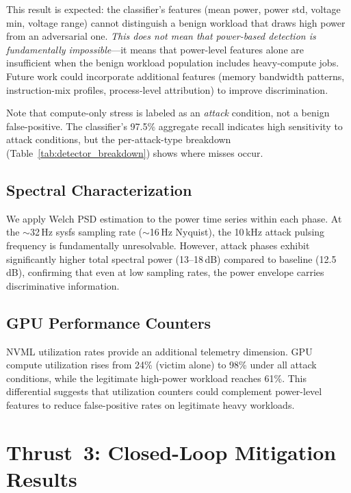 \documentclass[conference]{IEEEtran}
\begin{document}
This result is expected: the classifier's features (mean power, power
std, voltage min, voltage range) cannot distinguish a benign workload
that draws high power from an adversarial one.  \emph{This does not
mean that power-based detection is fundamentally impossible}---it means
that power-level features alone are insufficient when the benign
workload population includes heavy-compute jobs.  Future work could
incorporate additional features (memory bandwidth patterns,
instruction-mix profiles, process-level attribution) to improve
discrimination.

Note that compute-only stress is labeled as an \emph{attack}
condition, not a benign false-positive.  The classifier's 97.5\%
aggregate recall indicates high sensitivity to attack conditions,
but the per-attack-type breakdown (Table~\ref{tab:detector_breakdown})
shows where misses occur.

\subsection{Spectral Characterization}

We apply Welch PSD estimation to the power time series within each
phase.  At the $\sim$32\,Hz sysfs sampling rate ($\sim$16\,Hz
Nyquist), the 10\,kHz attack pulsing frequency is fundamentally
unresolvable.  However, attack phases exhibit significantly higher
total spectral power (13--18\,dB) compared to baseline
(12.5\,dB), confirming that even at low sampling rates, the power
envelope carries discriminative information.

\subsection{GPU Performance Counters}

NVML utilization rates provide an additional telemetry dimension.
GPU compute utilization rises from 24\% (victim alone) to 98\%
under all attack conditions, while the legitimate high-power
workload reaches 61\%.  This differential suggests that utilization
counters could complement power-level features to reduce
false-positive rates on legitimate heavy workloads.

\section{Thrust~3: Closed-Loop Mitigation Results}
\label{sec:t3}
\end{document}
